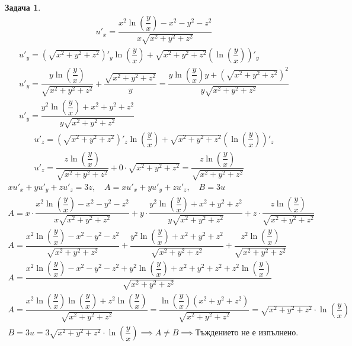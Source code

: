 \documentclass[a4paper,fleqn,12pt]{article}
\theoremstyle{definition}
\newtheorem{task}{Задача}[subsection]
\begin{document}
\begin{task}
\begin{gather*}
u'_x = \dfrac{x^2\ln{\left( \dfrac{y}{x}\right)} - x^2- y^2- z^2}{x\sqrt{x^2+y^2+z^2}}
\end{gather*} 
\begin{gather*}
u'_y = \left(\sqrt{x^2+y^2+z^2}\right)'_y \ln{\left( \dfrac{y}{x}\right)} + \sqrt{x^2+y^2+z^2}\left( \ln{\left( \dfrac{y}{x}\right)}\right)'_y \\
u'_y = \dfrac{y\ln{\left( \dfrac{y}{x}\right)}}{\sqrt{x^2+y^2+z^2}} + \dfrac{\sqrt{x^2+y^2+z^2}}{y} = \dfrac{y\ln{\left( \dfrac{y}{x}\right)}y + \left(\sqrt{x^2+y^2+z^2}\right)^2}{y\sqrt{x^2+y^2+z^2}}\\
u'_y = \dfrac{y^2\ln{\left( \dfrac{y}{x}\right)} + x^2 + y^2 + z^2}{y\sqrt{x^2+y^2+z^2}}
\end{gather*}
\begin{gather*}
u'_z = \left(\sqrt{x^2+y^2+z^2}\right)'_z\ln{\left( \dfrac{y}{x}\right)} + \sqrt{x^2+y^2+z^2}\left( \ln{\left( \dfrac{y}{x}\right)}\right)'_z \\
u'_z = \dfrac{z\ln{\left( \dfrac{y}{x}\right)}}{\sqrt{x^2+y^2+z^2}} + 0 \cdot \sqrt{x^2+y^2+z^2} = \dfrac{z\ln{\left( \dfrac{y}{x}\right)}}{\sqrt{x^2+y^2+z^2}}
\end{gather*}
\begin{gather*}
xu'_x + yu'_y + zu'_z = 3z , \quad A = xu'_x + yu'_y + zu'_z, \quad B = 3u\\
A = x \cdot \dfrac{x^2\ln{\left( \dfrac{y}{x}\right)} - x^2- y^2- z^2}{x\sqrt{x^2+y^2+z^2}} + y \cdot \dfrac{y^2\ln{\left( \dfrac{y}{x}\right)} + x^2 + y^2 + z^2}{y\sqrt{x^2+y^2+z^2}} + z \cdot \dfrac{z\ln{\left( \dfrac{y}{x}\right)}}{\sqrt{x^2+y^2+z^2}}\\
A = \dfrac{x^2\ln{\left( \dfrac{y}{x}\right)} - x^2- y^2- z^2}{\sqrt{x^2+y^2+z^2}} + \dfrac{y^2\ln{\left( \dfrac{y}{x}\right)} + x^2 + y^2 + z^2}{\sqrt{x^2+y^2+z^2}} + \dfrac{z^2\ln{\left( \dfrac{y}{x}\right)}}{\sqrt{x^2+y^2+z^2}}\\
A = \dfrac{x^2\ln{\left( \dfrac{y}{x}\right)} - x^2- y^2- z^2 + y^2\ln{\left( \dfrac{y}{x}\right)} + x^2 + y^2 + z^2 +z^2\ln{\left(\dfrac{y}{x}\right)}}{\sqrt{x^2+y^2+z^2}} \\
A = \dfrac{x^2\ln{\left( \dfrac{y}{x}\right)} \ln{\left( \dfrac{y}{x}\right)} + z^2\ln{\left(\dfrac{y}{x}\right)}}{\sqrt{x^2+y^2+z^2}} = \dfrac{\ln{\left( \dfrac{y}{x}\right)} (x^2 +y^2 + z^2)}{\sqrt{x^2+y^2+z^2}} = \sqrt{x^2+y^2+z^2}\cdot \ln{\left( \dfrac{y}{x}\right)}\\
B = 3u = 3\sqrt{x^2+y^2+z^2}\cdot \ln{\left( \dfrac{y}{x}\right)} \implies
A \neq B \implies \text{Тъждението не е изпълнено.}
\end{gather*}
\end{task}
\newpage
\end{document}
